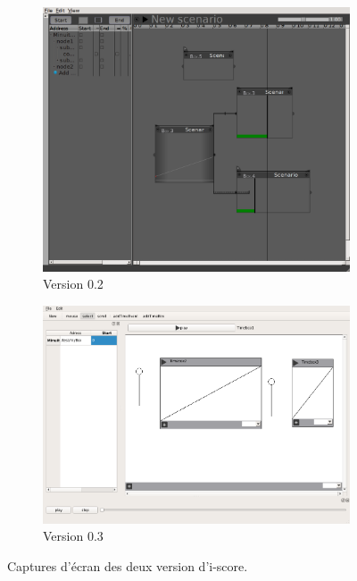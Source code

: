 \begin{figure}[H]
	\centering
	\begin{subfigure}{.5\textwidth}
		\centering
		\includegraphics[scale=0.2]{images/iscore02.png}
		\caption{Version 0.2}
	\end{subfigure} 
	
	\vspace{1em}
	
	\begin{subfigure}{.5\textwidth}
		\centering
		\includegraphics[scale=0.2]{images/iscore03.png}
		\caption{Version 0.3}
	\end{subfigure}
	
	\caption{Captures d'écran des deux version d'i-score.}
	\label{figIScore}
\end{figure}

